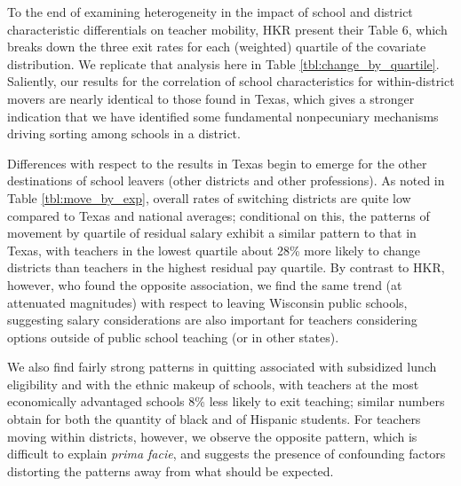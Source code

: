 \documentclass[12pt,]{article}
\begin{document}
To the end of examining heterogeneity in the impact of school and
district characteristic differentials on teacher mobility, HKR present
their Table 6, which breaks down the three exit rates for each
(weighted) quartile of the covariate distribution. We replicate that
analysis here in Table \ref{tbl:change_by_quartile}. Saliently, our
results for the correlation of school characteristics for
within-district movers are nearly identical to those found in Texas,
which gives a stronger indication that we have identified some
fundamental nonpecuniary mechanisms driving sorting among schools in a
district.

Differences with respect to the results in Texas begin to emerge for the
other destinations of school leavers (other districts and other
professions). As noted in Table \ref{tbl:move_by_exp}, overall rates of
switching districts are quite low compared to Texas and national
averages; conditional on this, the patterns of movement by quartile of
residual salary exhibit a similar pattern to that in Texas, with
teachers in the lowest quartile about 28\% more likely to change
districts than teachers in the highest residual pay quartile. By
contrast to HKR, however, who found the opposite association, we find
the same trend (at attenuated magnitudes) with respect to leaving
Wisconsin public schools, suggesting salary considerations are also
important for teachers considering options outside of public school
teaching (or in other states).

We also find fairly strong patterns in quitting associated with
subsidized lunch eligibility and with the ethnic makeup of schools, with
teachers at the most economically advantaged schools 8\% less likely to
exit teaching; similar numbers obtain for both the quantity of black and
of Hispanic students. For teachers moving within districts, however, we
observe the opposite pattern, which is difficult to explain \emph{prima
facie}, and suggests the presence of confounding factors distorting the
patterns away from what should be expected.
\end{document}
